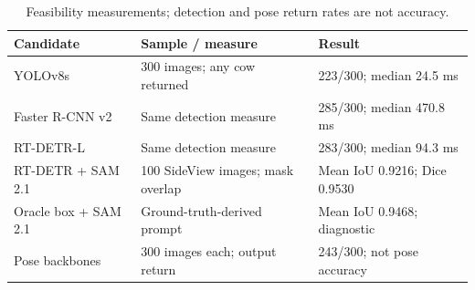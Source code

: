 \begin{table}[htbp]
\centering\small
\caption[Selected perception feasibility results]{Feasibility measurements; detection and pose return rates are not accuracy.}\label{tab:perception}
\begin{tabularx}{\textwidth}{lYY}
\toprule
Candidate & Sample / measure & Result \\
\midrule
YOLOv8s & 300 images; any cow returned & 223/300; median 24.5 ms \\
Faster R-CNN v2 & Same detection measure & 285/300; median 470.8 ms \\
RT-DETR-L & Same detection measure & 283/300; median 94.3 ms \\
RT-DETR + SAM 2.1 & 100 SideView images; mask overlap & Mean IoU 0.9216; Dice 0.9530 \\
Oracle box + SAM 2.1 & Ground-truth-derived prompt & Mean IoU 0.9468; diagnostic \\
Pose backbones & 300 images each; output return & 243/300; not pose accuracy \\
\bottomrule
\end{tabularx}
\end{table}
